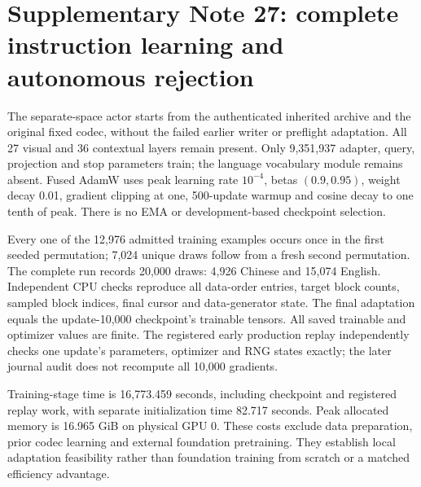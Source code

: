 \documentclass[10pt,a4paper]{article}
\begin{document}

\section*{Supplementary Note 27: complete instruction learning and autonomous rejection}
The separate-space actor starts from the authenticated inherited archive and
the original fixed codec, without the failed earlier writer or preflight
adaptation. All 27 visual and 36 contextual layers remain present. Only
9,351,937 adapter, query, projection and stop parameters train; the language
vocabulary module remains absent. Fused AdamW uses peak learning rate
$10^{-4}$, betas $(0.9,0.95)$, weight decay 0.01, gradient clipping at one,
500-update warmup and cosine decay to one tenth of peak. There is no EMA or
development-based checkpoint selection.

Every one of the 12,976 admitted training examples occurs once in the first
seeded permutation; 7,024 unique draws follow from a fresh second permutation.
The complete run records 20,000 draws: 4,926 Chinese and 15,074 English.
Independent CPU checks reproduce all data-order entries, target block counts,
sampled block indices, final cursor and data-generator state. The final
adaptation equals the update-10,000 checkpoint's trainable tensors. All saved
trainable and optimizer values are finite. The registered early production
replay independently checks one update's parameters, optimizer and RNG states
exactly; the later journal audit does not recompute all 10,000 gradients.

Training-stage time is 16,773.459 seconds, including checkpoint and registered
replay work, with separate initialization time 82.717 seconds. Peak allocated
memory is 16.965 GiB on physical GPU 0. These costs exclude data preparation,
prior codec learning and external foundation pretraining. They establish local
adaptation feasibility rather than foundation training from scratch or a
matched efficiency advantage.
\end{document}
